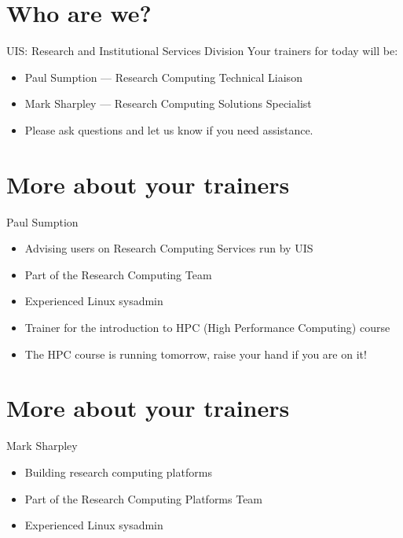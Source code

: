 \section{Who are we?}
\begin{frame}{UIS: Research and Institutional Services Division}
Your trainers for today will be:\\
\begin{itemize}
  \item Paul Sumption --- Research Computing Technical Liaison
    \item Mark Sharpley --- Research Computing Solutions Specialist
  \item\alert{Please ask questions and let us know if you need assistance.}
\end{itemize}
\end{frame}

\section{More about your trainers}
\begin{frame}{Paul Sumption}
\begin{itemize}
  \item Advising users on Research Computing Services run by UIS
  \item Part of the Research Computing Team
  \item Experienced Linux sysadmin 
  \item Trainer for the introduction to HPC (High Performance Computing) course
  \item\alert{The HPC course is running tomorrow, raise your hand if you are on it!}
\end{itemize}
\end{frame}

\section{More about your trainers}
\begin{frame}{Mark Sharpley}
\begin{itemize}
  \item Building research computing platforms
  \item Part of the Research Computing Platforms Team
  \item Experienced Linux sysadmin 
\end{itemize}
\end{frame}

